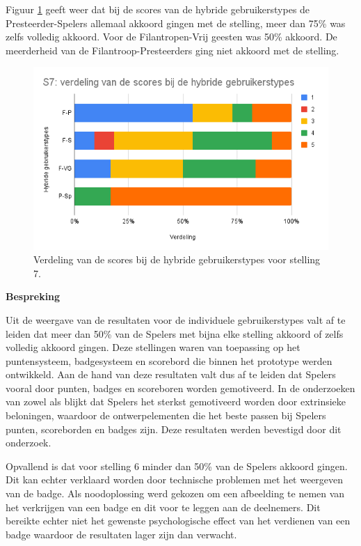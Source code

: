 Figuur \ref{fig:s7_hybride} geeft weer dat bij de scores van de hybride gebruikerstypes de Presteerder-Spelers allemaal akkoord gingen met de stelling, meer dan 75\% was zelfs volledig akkoord. Voor de Filantropen-Vrij geesten was 50\% akkoord. De meerderheid van de Filantroop-Presteerders ging niet akkoord met de stelling.

\begin{figure}
    \includegraphics[width=\linewidth]{S7_Hybride.png}
    \caption{Verdeling van de scores bij de hybride gebruikerstypes voor stelling 7.}
    \label{fig:s7_hybride}
\end{figure}

\textbf{Bespreking}

Uit de weergave van de resultaten voor de individuele gebruikerstypes valt af te leiden dat meer dan 50\% van de Spelers met bijna elke stelling akkoord of zelfs volledig akkoord gingen. Deze stellingen waren van toepassing op het puntensysteem, badgesysteem en scorebord die binnen het prototype werden ontwikkeld. Aan de hand van deze resultaten valt dus af te leiden dat Spelers vooral door punten, badges en scoreboren worden gemotiveerd. In de onderzoeken van zowel \textcite{Tondello2016} als \textcite{Carreno2018} blijkt dat Spelers het sterkst gemotiveerd worden door extrinsieke beloningen, waardoor de ontwerpelementen die het beste passen bij Spelers punten, scoreborden en badges zijn. Deze resultaten werden bevestigd door dit onderzoek.

Opvallend is dat voor stelling 6 minder dan 50\% van de Spelers akkoord gingen. Dit kan echter verklaard worden door technische problemen met het weergeven van de badge. Als noodoplossing werd gekozen om een afbeelding te nemen van het verkrijgen van een badge en dit voor te leggen aan de deelnemers. Dit bereikte echter niet het gewenste psychologische effect van het verdienen van een badge waardoor de resultaten lager zijn dan verwacht.




